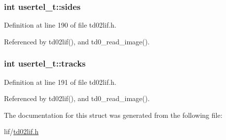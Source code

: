 \subsubsection[{\texorpdfstring{sides}{sides}}]{\setlength{\rightskip}{0pt plus 5cm}int usertel\+\_\+t\+::sides}\hypertarget{structusertel__t_a8add7bf3c4ef3422c8531c84c6f58129}{}\label{structusertel__t_a8add7bf3c4ef3422c8531c84c6f58129}


Definition at line 190 of file td02lif.\+h.



Referenced by td02lif(), and td0\+\_\+read\+\_\+image().

\subsubsection[{\texorpdfstring{tracks}{tracks}}]{\setlength{\rightskip}{0pt plus 5cm}int usertel\+\_\+t\+::tracks}\hypertarget{structusertel__t_afed111258495fd9c166720335613252f}{}\label{structusertel__t_afed111258495fd9c166720335613252f}


Definition at line 191 of file td02lif.\+h.



Referenced by td02lif(), and td0\+\_\+read\+\_\+image().



The documentation for this struct was generated from the following file\+:\begin{DoxyCompactItemize}
\item 
lif/\hyperlink{td02lif_8h}{td02lif.\+h}\end{DoxyCompactItemize}
